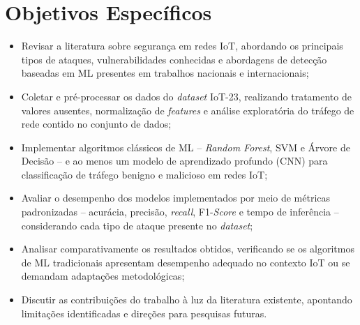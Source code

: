 \section{Objetivos Específicos}\label{sec:obj_espec}
\begin{itemize}[leftmargin=5em]
    \item Revisar a literatura sobre segurança em redes IoT, abordando os principais tipos de ataques, vulnerabilidades conhecidas e abordagens de detecção baseadas em ML presentes em trabalhos nacionais e internacionais;
    \item Coletar e pré-processar os dados do \textit{dataset} IoT-23, realizando tratamento de valores ausentes, normalização de \textit{features} e análise exploratória do tráfego de rede contido no conjunto de dados;
    \item Implementar algoritmos clássicos de ML -- \textit{Random Forest}, SVM e Árvore de Decisão -- e ao menos um modelo de aprendizado profundo (CNN) para classificação de tráfego benigno e malicioso em redes IoT;
    \item Avaliar o desempenho dos modelos implementados por meio de métricas padronizadas -- acurácia, precisão, \textit{recall}, F1-\textit{Score} e tempo de inferência -- considerando cada tipo de ataque presente no \textit{dataset};
    \item Analisar comparativamente os resultados obtidos, verificando se os algoritmos de ML tradicionais apresentam desempenho adequado no contexto IoT ou se demandam adaptações metodológicas;
    \item Discutir as contribuições do trabalho à luz da literatura existente, apontando limitações identificadas e direções para pesquisas futuras.
\end{itemize}